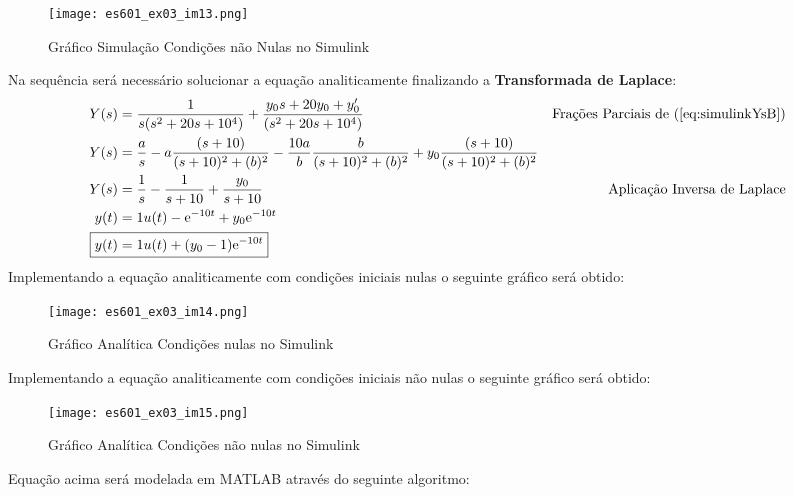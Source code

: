 \documentclass{article}
\begin{document}
\begin{resolution}
                    \begin{figure}[H]
                        \centering
                        \texttt{[image: es601\_ex03\_im13.png]}
                        \caption{Gráfico Simulação Condições não Nulas no Simulink}
                    \end{figure}
                Na sequência será necessário solucionar a equação analiticamente finalizando a \textbf{Transformada de Laplace}:
                    \begin{align}
                        Y(s) &= \frac{1}{s(s^2 + 20s + 10^4)} + \frac{y_{0}s + 20y_{0} + y'_{0}}{(s^2 + 20s + 10^4)} & \text{Frações Parciais de (\ref{eq:simulinkYsB})}\nonumber\\
                        Y(s) &= \frac{a}{s} - a\frac{(s+10)}{(s+10)^2 + (b)^2} - \frac{10a}{b}\frac{b}{(s+10)^2 + (b)^2} + y_{0}\frac{(s+10)}{(s+10)^2 + (b)^2} \nonumber\\
                        Y(s) &= \frac{1}{s} - \frac{1}{s + 10} + \frac{y_{0}}{s + 10} & \text{Aplicação Inversa de Laplace}\nonumber\\
                        y(t)         &= 1u(t) - \text{e}^{-10t} + y_{0}\text{e}^{-10t}\nonumber\\
                        \Aboxed{y(t) &= 1u(t) + (y_{0} - 1)\text{e}^{-10t}}
                    \end{align}
                Implementando a equação analiticamente com condições iniciais nulas o seguinte gráfico será obtido:
                    \begin{figure}[H]
                        \centering
                        \texttt{[image: es601\_ex03\_im14.png]}
                        \caption{Gráfico Analítica Condições nulas no Simulink}
                    \end{figure}
                Implementando a equação analiticamente com condições iniciais não nulas o seguinte gráfico será obtido:
                    \begin{figure}[H]
                        \centering
                        \texttt{[image: es601\_ex03\_im15.png]}
                        \caption{Gráfico Analítica Condições não nulas no Simulink}
                    \end{figure}
\newpage
                Equação acima será modelada em MATLAB através do seguinte algoritmo:
                    \begin{scriptsize}
                        \myOctave
                        

\end{scriptsize}
\end{resolution}
\end{document}
